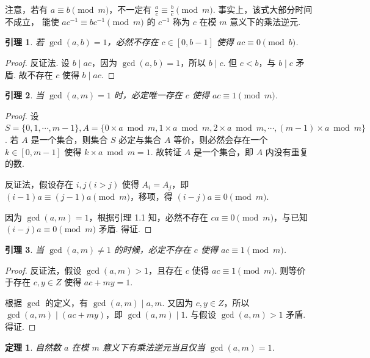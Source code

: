 \documentclass[a4paper]{article}
\newtheorem{theorem}{定理}[section]
\newtheorem{lemma}{引理}[section]
\begin{document}
注意，若有 $a\equiv b\pmod m$，不一定有 $\frac{a}{c}\equiv \frac{b}{c}\pmod m$. 事实上，该式大部分时间不成立，
能使 $ac^{-1}\equiv bc^{-1}\pmod m$ 的 $c^{-1}$ 称为 $c$ 在模 $m$ 意义下的乘法逆元.

\begin{lemma}
    若 $\gcd(a,b)=1$，必然不存在 $c\in [0,b-1]$ 使得 $ac\equiv 0\pmod b$.
\end{lemma}

\begin{proof}
    反证法. 设 $b\mid ac$，因为 $\gcd(a,b)=1$，所以 $b\mid c$. 但 $c<b$，与 $b\mid c$ 矛盾. 故不存在 $c$ 使得
    $b \mid ac$.
\end{proof}

\begin{lemma}
    当 $\gcd(a,m)=1$ 时，必定唯一存在 $c$ 使得 $ac\equiv 1\pmod m$.
\end{lemma}

\begin{proof}
    设 $S=\{0,1,\cdots,m-1\},A=\{0\times a \bmod m,1\times a \bmod m,2\times a \bmod m,\cdots,
        (m-1)\times a\bmod m\}$. 若 $A$ 是一个集合，则集合 $S$ 必定与集合 $A$ 等价，则必然会存在一个 $k\in[0
            ,m-1]$ 使得 $k\times a\bmod m=1$. 故转证 $A$ 是一个集合，即 $A$ 内没有重复的数.

    反证法，假设存在 $i,j(i>j)$ 使得 $A_i=A_j$，即 $(i-1)a\equiv (j-1)a\pmod m$，移项，得 $(i-j)a\equiv 0
        \pmod m$.

    因为 $\gcd(a,m)=1$，根据引理 1.1 知，必然不存在 $ca\equiv 0\pmod m$，与已知 $(i-j)a\equiv 0\pmod m$ 矛盾. 得证.
\end{proof}

\begin{lemma}
    当 $\gcd(a,m)\ne 1$ 的时候，必定不存在 $c$ 使得 $ac\equiv 1\pmod m$.
\end{lemma}

\begin{proof}
    反证法，假设 $\gcd(a,m)>1$，且存在 $c$ 使得 $ac\equiv 1\pmod m$. 则等价于存在 $c,y\in Z$ 使得 $ac+my=1$.

    根据 $\gcd$ 的定义，有 $\gcd(a,m)\mid a,m$. 又因为 $c,y\in Z$，所以 $\gcd(a,m)\mid (ac+my)$，即 $\gcd
        (a,m)\mid 1$. 与假设 $\gcd(a,m)>1$ 矛盾. 得证.
\end{proof}

\begin{theorem}
    自然数 $a$ 在模 $m$ 意义下有乘法逆元当且仅当 $\gcd(a,m)=1$.
\end{theorem}
\end{document}
